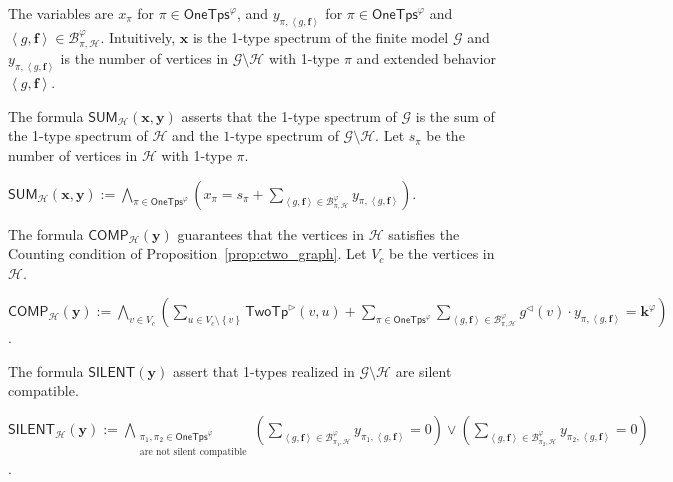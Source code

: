 \documentclass[10pt,a4paper]{article}
\theoremstyle{definition}
\theoremstyle{remark}
\newcommand{\cB}{\mathcal{B}}
\newcommand{\cG}{\mathcal{G}}
\newcommand{\cH}{\mathcal{H}}
\newcommand{\bff}{\mathbf{f}}
\newcommand{\bfk}{\mathbf{k}}
\newcommand{\bfx}{\mathbf{x}}
\newcommand{\bfy}{\mathbf{y}}
\newcommand{\twotypeof}{\mathsf{TwoTp}}
\newcommand{\onetypes}{\mathsf{OneTps}}
\newcommand{\set}[1]         {\left\{ #1 \right\}}
\newcommand{\tuple}[1]       {\left\langle #1 \right\rangle}
\newcommand{\trif} {\triangleright}
\newcommand{\trib} {\triangleleft}
\newcommand{\summ}  {\mathsf{SUM}}
\newcommand{\comp}  {\mathsf{COMP}}
\newcommand{\silent}  {\mathsf{SILENT}}
\begin{document}
\begin{compactitem}
    \item The variables are $x_\pi$ for $\pi \in \onetypes^\varphi$,
    and $y_{\pi, \tuple{g, \bff}}$ for $\pi \in \onetypes^\varphi$ and $\tuple{g, \bff} \in \cB^\varphi_{\pi, \cH}$.
    Intuitively, $\bfx$ is the 1-type spectrum of the finite model $\cG$ and $y_{\pi, \tuple{g, \bff}}$ is the number of vertices in $\cG \setminus \cH$ with 1-type $\pi$ and extended behavior $\tuple{g, \bff}$.
    \item
    The formula $\summ_{\cH}(\bfx, \bfy)$ asserts that the 1-type spectrum of $\cG$ is the sum of the 1-type spectrum of $\cH$ and
    the $1$-type spectrum of $\cG \setminus \cH$.
    Let $s_\pi$ be the number of vertices in $\cH$ with 1-type $\pi$. \\
    \begin{notsotiny}
    $\displaystyle\summ_{\cH}(\bfx, \bfy)
         := 
     \bigwedge_{\pi \in \onetypes^\varphi} \left(x_\pi = s_\pi + \sum_{\tuple{g, \bff} \in \cB^{\varphi}_{\pi, \cH}} y_{\pi, \tuple{g, \bff}}\right)$.
    \end{notsotiny}
    \item
    The formula $\comp_{\cH}(\bfy)$ guarantees that the vertices in $\cH$ satisfies the Counting condition of Proposition~\ref{prop:ctwo_graph}.
    Let $V_c$ be the vertices in $\cH$. \\
    \begin{notsotiny}
    $\displaystyle\comp_{\cH}(\bfy)
         := 
        \bigwedge_{v \in V_c} \left(
            \sum_{u \in V_c \setminus \set{v}} \twotypeof^\trif(v, u) +
            \sum_{\pi \in \onetypes^\varphi} \sum_{\tuple{g, \bff} \in \cB^{\varphi}_{\pi, \cH}} g^\trib(v) \cdot y_{\pi, \tuple{g, \bff}}
        = \bfk^\varphi \right)$.
        \end{notsotiny}
    \item
    The formula $\silent(\bfy)$ assert that 1-types realized in $\cG \setminus \cH$ are silent compatible. \\
    \begin{notsotiny}
    $\displaystyle\silent_{\cH}(\bfy)
         := 
        \bigwedge_{\substack{\pi_1, \pi_2 \in \onetypes^\varphi \\ \text{are not silent compatible}}}
        \left(\sum_{\tuple{g, \bff} \in \cB^{\varphi}_{\pi_1, \cH}} y_{\pi_1, \tuple{g, \bff}} = 0\right) \lor
        \left(\sum_{\tuple{g, \bff} \in \cB^{\varphi}_{\pi_2, \cH}} y_{\pi_2, \tuple{g, \bff}} = 0\right)$.
        \end{notsotiny}

\end{compactitem}
\end{document}
